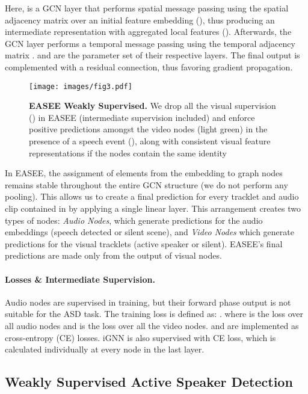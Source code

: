 \documentclass[10pt,twocolumn,letterpaper]{article}
\begin{document}
Here,  is a GCN layer that performs spatial message passing using the spatial adjacency matrix  over an initial feature embedding (), thus producing an intermediate representation with aggregated local features (). Afterwards, the GCN layer  performs a temporal message passing using the temporal adjacency matrix .  and  are the parameter set of their respective layers. The final output is complemented with a residual connection, thus favoring gradient propagation. 

\begin{figure}[t]
    \begin{center}
        \texttt{[image: images/fig3.pdf]}        
    \end{center}
    \caption{
        \textbf{EASEE Weakly Supervised.} We drop all the visual supervision () in EASEE (intermediate supervision included) and enforce positive predictions amongst the video nodes (light green) in the presence of a speech event (), along with consistent visual feature representations if the nodes contain the same identity
    }
    \label{fig:weakly}
\end{figure} 
In EASEE, the assignment of elements from the embedding  to graph nodes remains stable throughout the entire GCN structure (\ie we do not perform any pooling). This allows us to create a final prediction for every tracklet and audio clip contained in  by applying a single linear layer. This arrangement creates two types of nodes: \textit{Audio Nodes}, which generate predictions for the audio embeddings (\ie speech detected or silent scene), and \textit{Video Nodes} which generate predictions for the visual tracklets (\ie active speaker or silent). EASEE's final predictions are made only from the output of visual nodes.

\paragraph{Losses \& Intermediate Supervision.} Audio nodes are supervised in training, but their forward phase output is not suitable for the ASD task. The training loss is defined as: . where  is the loss over all audio nodes and  is the loss over all the video nodes.  and  are implemented as  cross-entropy (CE) losses.  iGNN is also supervised with  CE loss, which is calculated individually at every node in the last layer. 


\subsection{Weakly Supervised Active Speaker Detection} 
\end{document}
